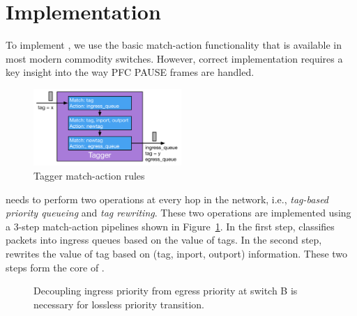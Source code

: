 \section{Implementation}\label{sec:implementation}

To implement \sysname{}, we use the basic match-action functionality that is
available in most modern commodity switches. However, correct implementation
requires a key insight into the way PFC PAUSE frames are handled.

\begin{figure}
	\hspace{-0.2in}
	\centering
	\includegraphics[width=0.5\textwidth] {figs/Tagger}
	\caption{Tagger match-action rules}\label{fig:tagger}
	
\end{figure}

 \sysname{} needs to perform two operations at every
hop in the network, i.e., {\em tag-based priority queueing} and {\em tag
rewriting}.  These two operations are implemented using a 3-step match-action
pipelines shown in Figure~\ref{fig:tagger}.  In the first step, \sysname{}
classifies packets into ingress queues based on the value of tags. In the second
step, \sysname{} rewrites the value of tag based on (tag, inport, outport)
information. These two steps form the core of \sysname{}.
 
\begin{figure}[t]
 	\centering

 	\caption{Decoupling ingress priority from egress priority at switch B is necessary for lossless priority transition.}\label{fig:prioritydecoupling}
	\vspace{-1em}
\end{figure}

